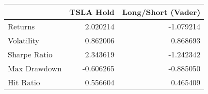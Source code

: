 \begin{tabular}{lrr}
\toprule
{} &  TSLA Hold &  Long/Short (Vader) \\
\midrule
Returns      &   2.020214 &           -1.079214 \\
Volatility   &   0.862006 &            0.868693 \\
Sharpe Ratio &   2.343619 &           -1.242342 \\
Max Drawdown &  -0.606265 &           -0.885050 \\
Hit Ratio    &   0.556604 &            0.465409 \\
\bottomrule
\end{tabular}
